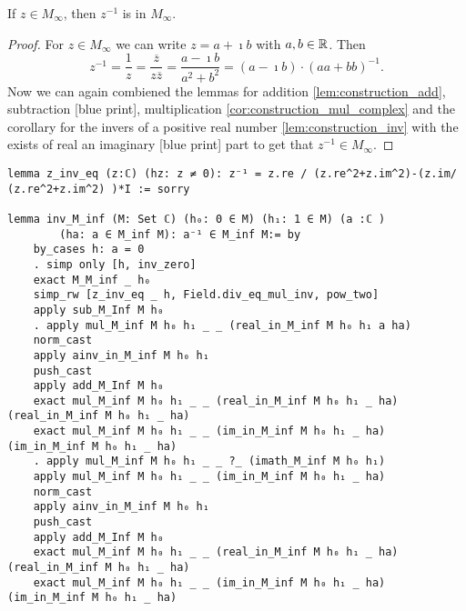 \begin{corollary}
    \label{cor:inv_M_inf}
    \leanok
    If $z \in M_{\infty}$, then $z^{-1}$ is in  $M_{\infty}$.
\end{corollary}
\begin{proof}
    For $z \in M_{\infty}$ we can write $z = a + \imath b$ with $a, b \in \mathbb{R}$. Then
    $$z^{-1} = \frac{1}{z} = \frac{\overline{z}}{z\overline{z}} = \frac{a - \imath b}{a^2+b^2}= (a - \imath b) \cdot (aa+bb)^{-1}.$$
    Now we can again combiened the lemmas for addition \ref{lem:construction_add}, subtraction [blue print], multiplication \ref{cor:construction_mul_complex} and the corollary for the invers of a positive real number \ref{lem:construction_inv} with the exists of real an imaginary [blue print] part to get that $z^{-1} \in M_{\infty}$.
\end{proof}
\begin{lstlisting}
lemma z_inv_eq (z:ℂ) (hz: z ≠ 0): z⁻¹ = z.re / (z.re^2+z.im^2)-(z.im/ (z.re^2+z.im^2) )*I := sorry

lemma inv_M_inf (M: Set ℂ) (h₀: 0 ∈ M) (h₁: 1 ∈ M) (a :ℂ ) 
        (ha: a ∈ M_inf M): a⁻¹ ∈ M_inf M:= by
    by_cases h: a = 0
    . simp only [h, inv_zero]
    exact M_M_inf _ h₀
    simp_rw [z_inv_eq _ h, Field.div_eq_mul_inv, pow_two]
    apply sub_M_Inf M h₀
    . apply mul_M_inf M h₀ h₁ _ _ (real_in_M_inf M h₀ h₁ a ha)
    norm_cast
    apply ainv_in_M_inf M h₀ h₁
    push_cast
    apply add_M_Inf M h₀
    exact mul_M_inf M h₀ h₁ _ _ (real_in_M_inf M h₀ h₁ _ ha) (real_in_M_inf M h₀ h₁ _ ha)
    exact mul_M_inf M h₀ h₁ _ _ (im_in_M_inf M h₀ h₁ _ ha) (im_in_M_inf M h₀ h₁ _ ha)
    . apply mul_M_inf M h₀ h₁ _ _ ?_ (imath_M_inf M h₀ h₁)
    apply mul_M_inf M h₀ h₁ _ _ (im_in_M_inf M h₀ h₁ _ ha)
    norm_cast
    apply ainv_in_M_inf M h₀ h₁
    push_cast
    apply add_M_Inf M h₀
    exact mul_M_inf M h₀ h₁ _ _ (real_in_M_inf M h₀ h₁ _ ha) (real_in_M_inf M h₀ h₁ _ ha)
    exact mul_M_inf M h₀ h₁ _ _ (im_in_M_inf M h₀ h₁ _ ha) (im_in_M_inf M h₀ h₁ _ ha)
\end{lstlisting}